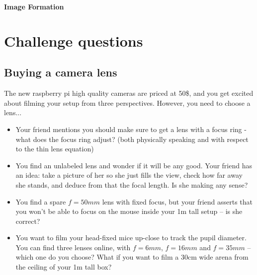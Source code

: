 \documentclass[a4paper]{report}
\begin{document}
	
	\setcounter{secnumdepth}{2}
	
	\begin{center}
		\textbf{\Large{Image Formation}}
	\end{center}
	
	\section{Challenge questions}
	
	
    \subsection{Buying a camera lens}
    \hypertarget{hintBack-buying}{}
    The new raspberry pi high quality cameras are priced at 50\$, and you get excited about filming your setup from three perspectives. However, you need to choose a lens...
    
    \begin{itemize}
        \item Your friend mentions you should make sure to get a lens with a focus ring - what does the focus ring adjust? (both physically speaking and with respect to the thin lens equation)
        \item You find an unlabeled lens and wonder if it will be any good. Your friend has an idea: take a picture of her so she just fills the view, check how far away she stands, and deduce from that the focal length. Is she making any sense?
        \item You find a spare $f=50mm$ lens with fixed focus, but your friend asserts that you won't be able to focus on the mouse inside your 1m tall setup -- is she correct?
        \item You want to film your head-fixed mice up-close to track the pupil diameter. You can find three lenses online, with $f=6mm$, $f=16mm$ and $f=35mm$ -- which one do you choose? What if you want to film a 30cm wide arena from the ceiling of your 1m tall box?
    \end{itemize}

    
    
\end{document}
